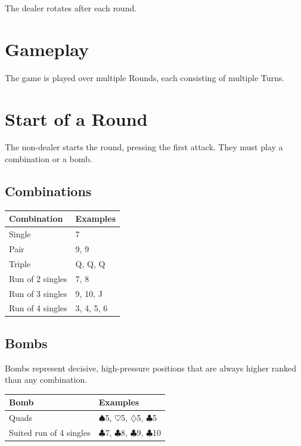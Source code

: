 \documentclass[11pt,a4paper]{article}
\begin{document}
The dealer rotates after each round.

\section{Gameplay}

The game is played over multiple Rounds, each consisting of multiple Turns.

\section{Start of a Round}

The non-dealer starts the round, pressing the first attack. They must play a combination or a bomb.

\subsection{Combinations}

\begin{table}[h]
\centering
\begin{tabular}{@{}ll@{}}
\toprule
\textbf{Combination} & \textbf{Examples} \\
\midrule
Single & 7 \\
Pair & 9, 9 \\
Triple & Q, Q, Q \\
Run of 2 singles & 7, 8 \\
Run of 3 singles & 9, 10, J \\
Run of 4 singles & 3, 4, 5, 6 \\
\bottomrule
\end{tabular}
\end{table}

\subsection{Bombs}

Bombs represent decisive, high-pressure positions that are always higher ranked than any combination.

\begin{table}[h]
\centering
\begin{tabular}{@{}ll@{}}
\toprule
\textbf{Bomb} & \textbf{Examples} \\
\midrule
Quads & $\spadesuit$5, $\heartsuit$5, $\diamondsuit$5, $\clubsuit$5 \\
Suited run of 4 singles & $\clubsuit$7, $\clubsuit$8, $\clubsuit$9, $\clubsuit$10 \\
\bottomrule
\end{tabular}
\end{table}
\end{document}
